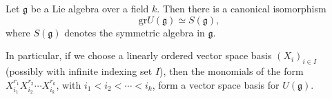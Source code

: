 \begin{theorem}
\label{theorem-PBW}
Let $\mathfrak g$ be a Lie algebra over a field $k$. Then there is a canonical isomorphism 
\begin{equation}
 \label{equation-PBW}
\text{gr} U(\mathfrak g) \simeq S(\mathfrak g),
\end{equation}
where $S(\mathfrak g)$ denotes the symmetric algebra in $\mathfrak g$.

In particular, if we choose a linearly ordered vector space basis $(X_i)_{i\in I}$ (possibly with infinite indexing set $I$), then the monomials of the form $X_{i_1}^{r_1}X_{i_2}^{r_2}\cdots X_{i_k}^{r_k}$, with $i_1< i_2< \cdots< i_k$, form a vector space basis for $U(\mathfrak g)$.
\end{theorem}

